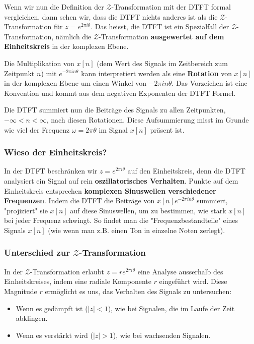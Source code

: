 \documentclass[11pt]{article}
\begin{document}
Wenn wir nun die Definition der $\mathcal{Z}$-Transformation mit der DTFT formal vergleichen, dann sehen wir, dass die DTFT nichts anderes ist als die $\mathcal{Z}$-Transformation für $z=e^{2\pi i \theta}$. Das heisst, die DTFT ist ein Spezialfall der $\mathcal{Z}$-Transformation, nämlich die $\mathcal{Z}$-Transformation \textbf{ausgewertet auf dem Einheitskreis} in der komplexen Ebene.

Die Multiplikation von $x[n]$ (dem Wert des Signals im Zeitbereich zum Zeitpunkt $n$) mit $e^{-2 \pi i n \theta}$ kann interpretiert werden als eine \textbf{Rotation} von $x[n]$ in der komplexen Ebene um einen Winkel von $-2 \pi i n \theta$. Das Vorzeichen ist eine Konvention und kommt aus dem negativen Exponenten der DTFT Formel.

Die DTFT summiert nun die Beiträge des Signals zu allen Zeitpunkten, $-\infty < n < \infty$, nach diesen Rotationen. Diese Aufsummierung misst im Grunde wie viel der Frequenz $\omega = 2 \pi \theta$ im Signal $x[n]$ präsent ist.

\vspace*{-0.5cm}
\subsubsection*{Wieso der Einheitskreis?}
\vspace*{-0.5cm}
In der DTFT beschränken wir $z = e^{2 \pi i \theta}$ auf den Einheitskreis, denn die DTFT analysiert ein Signal auf rein \textbf{oszillatorisches Verhalten}. Punkte auf dem Einheitskreis entsprechen \textbf{komplexen Sinuswellen verschiedener Frequenzen}. Indem die DTFT die Beiträge von $x[n]e^{-2 \pi i n \theta}$ summiert, "projiziert" sie $x[n]$ auf diese Sinuswellen, um zu bestimmen, wie stark $x[n]$ bei jeder Frequenz schwingt. So findet man die "Frequenzbestandteile" eines Signals $x[n]$ (wie wenn man z.B. einen Ton in einzelne Noten zerlegt).

\vspace*{-0.5cm}
\subsubsection*{Unterschied zur $\mathcal{Z}$-Transformation}
\vspace*{-0.5cm}
In der $\mathcal{Z}$-Transformation erlaubt $z= r e^{2 \pi i \theta}$ eine Analyse ausserhalb des Einheitskreises, indem eine radiale Komponente $r$ eingeführt wird. Diese Magnitude $r$  ermöglicht es uns, das Verhalten des Signals zu untersuchen:
\vspace*{-0.5cm}
\begin{itemize}
    \item Wenn es gedämpft ist ($|z|<1$), wie bei Signalen, die im Laufe der Zeit abklingen.
    \item Wenn es verstärkt wird ($|z|>1$), wie bei wachsenden Signalen.
\end{itemize}
\end{document}
